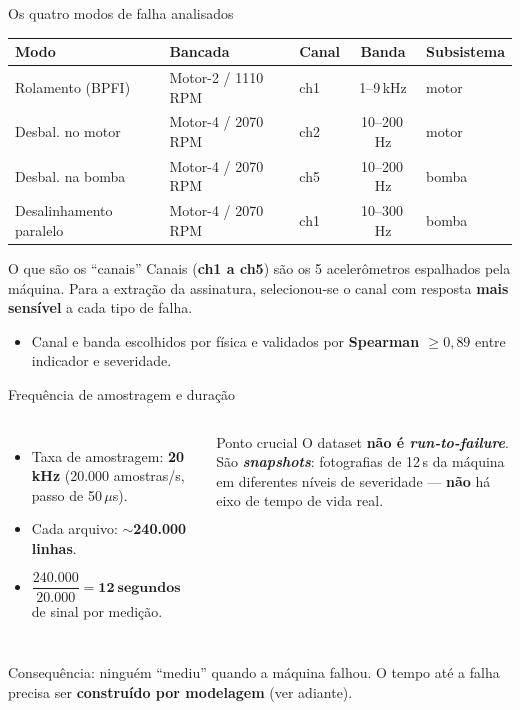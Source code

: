 \documentclass{beamer}
\begin{document}
\begin{frame}{Os quatro modos de falha analisados}
    \footnotesize
    \begin{tabular}{lllcl}
        \toprule
        \textbf{Modo} & \textbf{Bancada} & \textbf{Canal} & \textbf{Banda} & \textbf{Subsistema} \\
        \midrule
        Rolamento (BPFI)        & Motor-2 / 1110\,RPM & ch1 & 1--9\,kHz & motor \\
        Desbal. no motor        & Motor-4 / 2070\,RPM & ch2 & 10--200\,Hz & motor \\
        Desbal. na bomba        & Motor-4 / 2070\,RPM & ch5 & 10--200\,Hz & bomba \\
        Desalinhamento paralelo & Motor-4 / 2070\,RPM & ch1 & 10--300\,Hz & bomba \\
        \bottomrule
    \end{tabular}
    \normalsize
    \vspace{0.2cm}
    \begin{block}{O que são os ``canais''}
        \footnotesize Canais (\textbf{ch1 a ch5}) são os 5 acelerômetros espalhados pela máquina. Para a extração da assinatura, selecionou-se o canal com resposta \textbf{mais sensível} a cada tipo de falha.
    \end{block}
    \vspace{0.1cm}
    \footnotesize
    \begin{itemize}
        \item Canal e banda escolhidos por física e validados por \textbf{Spearman $\geq 0{,}89$} entre indicador e severidade.
    \end{itemize}
\end{frame}

\begin{frame}{Frequência de amostragem e duração}
    \begin{columns}
        \begin{itemize}
            \item Taxa de amostragem: \textbf{20\,kHz} (20.000 amostras/s, passo de 50\,$\mu$s).
            \item Cada arquivo: \textbf{$\sim$240.000 linhas}.
            \item $\dfrac{240{.}000}{20{.}000} = \mathbf{12\ \text{segundos}}$ de sinal por medição.
        \end{itemize}
        \begin{alertblock}{Ponto crucial}
            O dataset \textbf{não é \textit{run-to-failure}}.\\[4pt]
            São \textbf{\textit{snapshots}}: fotografias de 12\,s da máquina em diferentes níveis de severidade --- \textbf{não} há eixo de tempo de vida real.
        \end{alertblock}
    \end{columns}
    \vspace{0.2cm}
    \footnotesize Consequência: ninguém ``mediu'' quando a máquina falhou. O tempo até a falha precisa ser \textbf{construído por modelagem} (ver adiante).
\end{frame}
\end{document}
